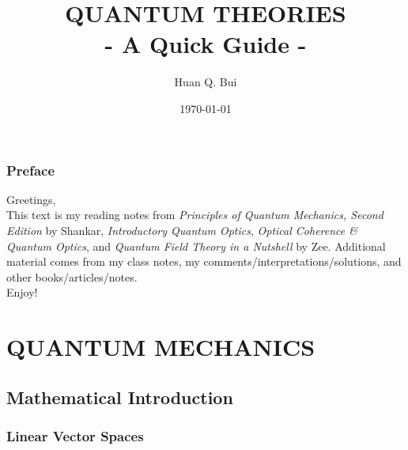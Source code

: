 \documentclass{book}
\theoremstyle{definition}
\begin{document}
\begin{titlepage}\centering
 \clearpage
 \title{{\textsc{\textbf{QUANTUM THEORIES}}}\\ \smallskip - A Quick Guide - \\}
 \author{\bigskip Huan Q. Bui}
 \date{\today}
 \maketitle
 \thispagestyle{empty}
\end{titlepage}

\subsection*{Preface}

Greetings,\\

This text is my reading notes from \textit{Principles of Quantum Mechanics, Second Edition} by Shankar, \textit{Introductory Quantum Optics}, \textit{Optical Coherence \& Quantum Optics}, and \textit{Quantum Field Theory in a Nutshell} by Zee. Additional material comes from my class notes, my comments/interpretations/solutions, and other books/articles/notes. \\

Enjoy!

\newpage
\tableofcontents
\newpage





\chapter{QUANTUM MECHANICS}


\newpage


\section{Mathematical Introduction}

\subsection{Linear Vector Spaces}
\end{document}
